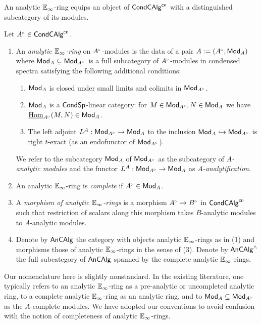 An analytic $\mathbb{E}_{\infty}$-ring equips an object of $\mathsf{Cond}\mathsf{CAlg}^{\mathsf{cn}}$ with a distinguished subcategory of its modules. 
\begin{definition}\label{def: analytic E-infinity ring}
    Let $A^{\tri}\in\Cond\CAlg^{\cn}$. 
    \begin{enumerate}
        \item An \emph{analytic $\mathbb{E}_{\infty}$-ring} on $A^{\tri}$-modules is the data of a pair $A:=(A^{\tri},\Mod_{A})$ where $\Mod_{A}\subseteq\Mod_{A^{\tri}}$ is a full subcategory of $A^{\tri}$-modules in condensed spectra satisfying the following additional conditions: 
        \begin{enumerate}[label=(\roman*)]
            \item $\mathsf{Mod}_{A}$ is closed under small limits and colimits in $\Mod_{A^{\tri}}$. 
            \item $\mathsf{Mod}_{A}$ is a $\mathsf{Cond}\mathsf{Sp}$-linear category: for $M\in\Mod_{A^{\tri}},N\in\Mod_{A}$ we have $\intHom_{A^{\tri}}(M,N)\in\Mod_{A}$. 
            \item The left adjoint $L^{A}:\Mod_{A^{\tri}}\to\Mod_{A}$ to the inclusion $\Mod_{A}\hookrightarrow\Mod_{A^{\tri}}$ is right $t$-exact (as an endofunctor of $\Mod_{A^{\tri}}$). 
        \end{enumerate} 
        We refer to the subcategory $\mathsf{Mod}_{A}$ of $\Mod_{A^{\tri}}$ as the subcategory of \emph{$A$-analytic modules} and the functor $L^{A}:\Mod_{A^{\tri}}\to\Mod_{A}$ as \emph{$A$-analytification}. 
        \item An analytic $\mathbb{E}_{\infty}$-ring is \emph{complete} if $A^{\tri}\in\Mod_{A}$. 
        \item A \emph{morphism of analytic $\mathbb{E}_{\infty}$-rings} is a morphism $A^{\tri}\to B^{\tri}$ in $\mathsf{Cond}\mathsf{CAlg}^{\mathsf{cn}}$ such that restriction of scalars along this morphism takes $B$-analytic modules to $A$-analytic modules. 
        \item Denote by $\mathsf{An}\mathsf{CAlg}$ the category with objects analytic $\mathbb{E}_{\infty}$-rings as in (1) and morphisms those of analytic $\mathbb{E}_{\infty}$-rings in the sense of (3). Denote by $\mathsf{An}\mathsf{CAlg}^{\wedge}$ the full subcategory of $\mathsf{An}\mathsf{CAlg}$ spanned by the complete analytic $\mathbb{E}_{\infty}$-rings. 
    \end{enumerate}
\end{definition}
\begin{remark}\label{rmk: analytic v complete modules}
    Our nomenclature here is slightly nonstandard. In the existing literature, one typically refers to an analytic $\mathbb{E}_{\infty}$-ring as a pre-analytic or uncompleted analytic ring, to a complete analytic $\mathbb{E}_{\infty}$-ring as an analytic ring, and to $\Mod_{A}\subseteq\Mod_{A^{\tri}}$ as the $A$-complete modules. We have adopted our conventions to avoid confusion with the notion of completeness of analytic $\mathbb{E}_{\infty}$-rings. 
\end{remark}
